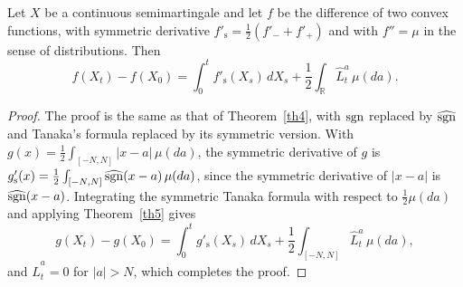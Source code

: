 \begin{theorem}\label{th:symitotanaka}
	Let $X$ be a continuous semimartingale and let $f$ be the difference of two
	convex functions, with symmetric derivative
	$f'_{\mathrm{s}}=\frac{1}{2}(f'_- +f'_+)$ and with $f''=\mu$ in the sense of
	distributions. Then
	\[
		f(X_t)-f(X_0)=\int_0^t f'_{\mathrm{s}}(X_s)\,dX_s
		+ \frac{1}{2}\int_\mathbb{R} \hat{L}_t^a\, \mu (da) .
	\]
\end{theorem}

\begin{proof}
	The proof is the same as that of Theorem~\ref{th4}, with $\operatorname{sgn}$ replaced by
	$\widehat{\operatorname{sgn}}$ and Tanaka's formula replaced by its symmetric version. With
	$g(x)=\frac{1}{2}\int_{[-N,N]} |x-a|\,\mu(da)$, the symmetric derivative of
	$g$ is $g'_{\mathrm{s}}(x)=\frac{1}{2}\int_{[-N,N]} \widehat{\operatorname{sgn}}(x-a)\,\mu(da)$,
	since the symmetric derivative of $|x-a|$ is $\widehat{\operatorname{sgn}}(x-a)$.
	Integrating the symmetric Tanaka formula with respect to
	$\frac{1}{2}\mu(da)$ and applying Theorem~\ref{th5} gives
	\[
		g(X_t)-g(X_0)= \int_0^t g'_{\mathrm{s}}(X_s)\,dX_s
		+ \frac{1}{2} \int_{[-N,N]} \hat{L}_t^a\,\mu(da),
	\]
	and $\hat{L}_t^a=0$ for $|a| > N$, which completes the proof.
\end{proof}
